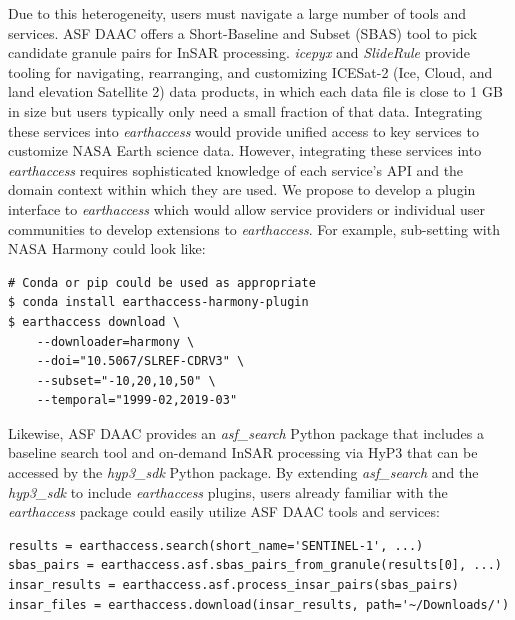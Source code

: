 \documentclass{ROSES-NASA-proposal}
\newcommand{\earthaccess}{\textit{earthaccess}\xspace} %
\begin{document}
Due to this heterogeneity, users must navigate a large number of tools and services. ASF DAAC offers a Short-Baseline and Subset (SBAS) tool to pick candidate granule pairs for InSAR processing. \textit{icepyx} \citep{icepyx:joss2023} and \textit{SlideRule} \citep{Shean2023} provide tooling for navigating, rearranging, and customizing ICESat-2 (Ice, Cloud, and land elevation Satellite 2) data products, in which each data file is close to 1 GB in size but users typically only need a small fraction of that data. Integrating these services into \earthaccess would provide unified access to key services to customize NASA Earth science data. However, integrating these services into \earthaccess requires sophisticated knowledge of each service's API and the domain context within which they are used. We propose to develop a plugin interface to \earthaccess which would allow service providers or individual user communities to develop extensions to \earthaccess. For example, sub-setting with NASA Harmony could look like:

\begin{listing}[h]
\begin{verbatim}
# Conda or pip could be used as appropriate
$ conda install earthaccess-harmony-plugin
$ earthaccess download \
    --downloader=harmony \
    --doi="10.5067/SLREF-CDRV3" \
    --subset="-10,20,10,50" \
    --temporal="1999-02,2019-03"
\end{verbatim}
\caption{A proposed Harmony plugin enables subsetting the data with Harmony instead of downloading full granules!}
\label{listing:5}
\end{listing}

Likewise, ASF DAAC provides an \textit{asf\_search} Python package that includes a baseline search tool and on-demand InSAR processing via HyP3 that can be accessed by the \textit{hyp3\_sdk} Python package. By extending \textit{asf\_search} and the \textit{hyp3\_sdk} to include \earthaccess plugins, users already familiar with the \earthaccess package could easily utilize ASF DAAC tools and services:

\begin{listing}[H]
\begin{verbatim}
results = earthaccess.search(short_name='SENTINEL-1', ...)
sbas_pairs = earthaccess.asf.sbas_pairs_from_granule(results[0], ...)
insar_results = earthaccess.asf.process_insar_pairs(sbas_pairs)
insar_files = earthaccess.download(insar_results, path='~/Downloads/')
\end{verbatim}
\caption{Demonstration of using \earthaccess plugins for ASF DAAC tools and services.}
\label{listing:6}
\end{listing}
\end{document}
